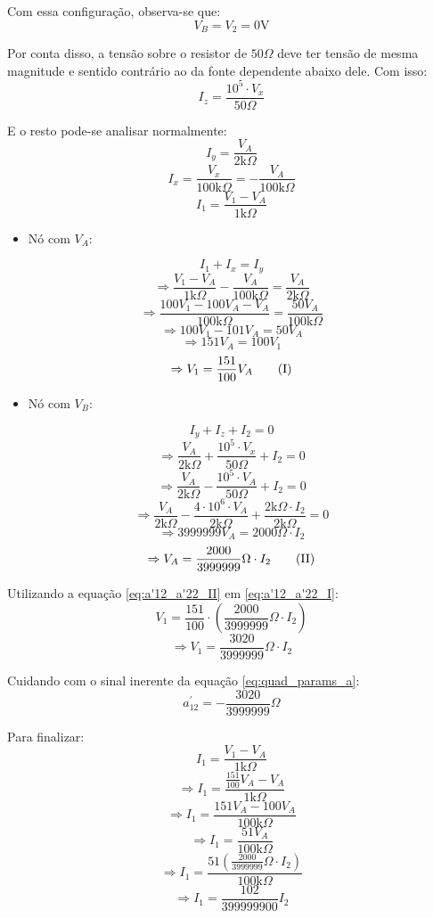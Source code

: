 \documentclass{report}
\begin{document}
Com essa configuração, observa-se que:
$$ V_B = V_2 = 0\text{V} $$

Por conta disso, a tensão sobre o resistor de $ 50\Omega $ deve ter tensão de mesma magnitude e sentido contrário ao da fonte dependente
abaixo dele. Com isso:
$$ I_z = \frac{10^5 \cdot V_x}{50\Omega} $$

E o resto pode-se analisar normalmente:
$$ I_y = \frac{V_A}{2\text{k}\Omega} $$
$$ I_x = \frac{V_x}{100\text{k}\Omega} = - \frac{V_A}{100\text{k}\Omega} $$
$$ I_1 = \frac{V_1 - V_A}{1\text{k}\Omega} $$

\begin{itemize}
  \item Nó com $ V_A $:
\end{itemize}
$$ I_1 + I_x = I_y $$
$$ \Rightarrow \frac{V_1 - V_A}{1\text{k}\Omega} - \frac{V_A}{100\text{k}\Omega} = \frac{V_A}{2\text{k}\Omega} $$
$$ \Rightarrow \frac{100V_1 - 100V_A - V_A}{100\text{k}\Omega} = \frac{50V_A}{100\text{k}\Omega} $$
$$ \Rightarrow 100V_1 - 101V_A = 50V_A $$
$$ \Rightarrow 151V_A = 100V_1 $$
\begin{equation}
  \label{eq:a'12_a'22_I}
  \centering
  \Rightarrow V_1 = \frac{151}{100}V_A \tag{I}
\end{equation}

\begin{itemize}
  \item Nó com $ V_B $:
\end{itemize}
$$ I_y + I_z + I_2 = 0 $$
$$ \Rightarrow \frac{V_A}{2\text{k}\Omega} + \frac{10^5 \cdot V_x}{50\Omega} + I_2 = 0 $$
$$ \Rightarrow \frac{V_A}{2\text{k}\Omega} - \frac{10^5 \cdot V_A}{50\Omega} + I_2 = 0 $$
$$ \Rightarrow \frac{V_A}{2\text{k}\Omega} - \frac{4 \cdot 10^6 \cdot V_A}{2\text{k}\Omega} + \frac{2\text{k}\Omega \cdot I_2}{2\text{k}\Omega} = 0 $$
$$ \Rightarrow 3999999V_A = 2000\Omega \cdot I_2 $$
\begin{equation}
  \label{eq:a'12_a'22_II}
  \centering
  \Rightarrow V_A = \frac{2000}{3999999} \Omega \cdot I_2 \tag{II}
\end{equation}

Utilizando a equação \ref{eq:a'12_a'22_II} em \ref{eq:a'12_a'22_I}:
$$ V_1 = \frac{151}{100} \cdot \left( \frac{2000}{3999999} \Omega \cdot I_2 \right) $$
$$ \Rightarrow V_1 = \frac{3020}{3999999} \Omega \cdot I_2 $$

Cuidando com o sinal inerente da equação \ref{eq:quad_params_a}:
$$ a^{'}_{12} = - \frac{3020}{3999999} \Omega $$

Para finalizar:
$$ I_1 = \frac{V_1 - V_A}{1\text{k}\Omega} $$
$$ \Rightarrow I_1 = \frac{\frac{151}{100}V_A - V_A}{1\text{k}\Omega} $$
$$ \Rightarrow I_1 = \frac{151V_A - 100V_A}{100\text{k}\Omega} $$
$$ \Rightarrow I_1 = \frac{51V_A}{100\text{k}\Omega} $$
$$ \Rightarrow I_1 = \frac{51\left( \frac{2000}{3999999} \Omega \cdot I_2 \right)}{100\text{k}\Omega} $$
$$ \Rightarrow I_1 = \frac{102}{399999900} I_2 $$
\end{document}
